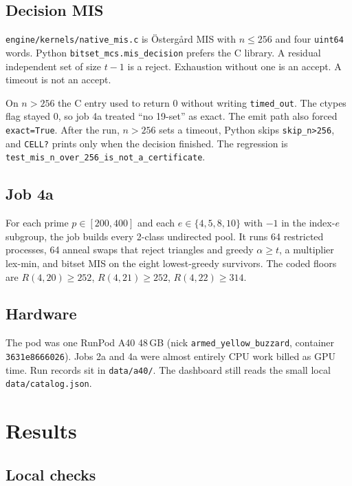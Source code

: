 \documentclass[11pt,a4paper]{article}
\begin{document}
\subsection{Decision MIS}

\texttt{engine/kernels/native\_mis.c} is \"Osterg\aa{}rd MIS with
$n\le 256$ and four \texttt{uint64} words. Python
\texttt{bitset\_mcs.mis\_decision} prefers the C library. A residual
independent set of size $t-1$ is a reject. Exhaustion without one is
an accept. A timeout is not an accept.

On $n>256$ the C entry used to return $0$ without writing
\texttt{timed\_out}. The ctypes flag stayed $0$, so job 4a treated
``no 19-set'' as exact. The emit path also forced \texttt{exact=True}.
After the run, $n>256$ sets a timeout, Python skips
\texttt{skip\_n>256}, and \texttt{CELL?} prints only when the decision
finished. The regression is
\texttt{test\_mis\_n\_over\_256\_is\_not\_a\_certificate}.

\subsection{Job 4a}

For each prime $p\in[200,400]$ and each $e\in\{4,5,8,10\}$ with
$-1$ in the index-$e$ subgroup, the job builds every 2-class undirected
pool. It runs 64 restricted processes, 64 anneal swaps that reject
triangles and greedy $\alpha\ge t$, a multiplier lex-min, and bitset
MIS on the eight lowest-greedy survivors. The coded floors are
$R(4,20)\ge 252$, $R(4,21)\ge 252$, $R(4,22)\ge 314$.

\subsection{Hardware}

The pod was one RunPod A40 48\,GB (nick \texttt{armed\_yellow\_buzzard},
container \texttt{3631e8666026}). Jobs 2a and 4a were almost entirely
CPU work billed as GPU time. Run records sit in \texttt{data/a40/}.
The dashboard still reads the small local \texttt{data/catalog.json}.

\section{Results}

\subsection{Local checks}
\end{document}
